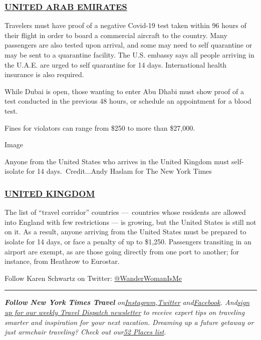 \hypertarget{united-arab-emirates}{%
\subsubsection{\texorpdfstring{\href{https://ae.usembassy.gov/u-s-citizen-services/covid-19-information/}{UNITED
ARAB EMIRATES}}{UNITED ARAB EMIRATES}}\label{united-arab-emirates}}

Travelers must have proof of a negative Covid-19 test taken within 96
hours of their flight in order to board a commercial aircraft to the
country. Many passengers are also tested upon arrival, and some may need
to self quarantine or may be sent to a quarantine facility. The U.S.
embassy says all people arriving in the U.A.E. are urged to self
quarantine for 14 days. International health insurance is also required.

While Dubai is open, those wanting to enter Abu Dhabi must show proof of
a test conducted in the previous 48 hours, or schedule an appointment
for a blood test.

Fines for violators can range from \$250 to more than \$27,000.

Image

Anyone from the United States who arrives in the United Kingdom must
self-isolate for 14 days.~Credit...Andy Haslam for The New York Times

\hypertarget{united-kingdom}{%
\subsubsection{\texorpdfstring{\href{https://www.gov.uk/uk-border-control}{UNITED
KINGDOM}}{UNITED KINGDOM}}\label{united-kingdom}}

The list of ``travel corridor'' countries ---~countries whose residents
are allowed into England with few restrictions --- is growing, but the
United States is still not on it. As a result, anyone arriving from the
United States must be prepared to isolate for 14 days, or face a penalty
of up to \$1,250. Passengers transiting in an airport are exempt, as are
those going directly from one port to another; for instance, from
Heathrow to Eurostar.

Follow Karen Schwartz on Twitter:
\href{https://twitter.com/wanderwomanisme?lang=en}{@WanderWomanIsMe}

\begin{center}\rule{0.5\linewidth}{\linethickness}\end{center}

\emph{\textbf{Follow New York Times Travel}}
\emph{on}\href{https://www.instagram.com/nytimestravel/}{\emph{Instagram}}\emph{,}\href{https://twitter.com/nytimestravel}{\emph{Twitter}}
\emph{and}\href{https://www.facebook.com/nytimestravel/}{\emph{Facebook}}\emph{.
And}\href{https://www.nytimes.com/newsletters/traveldispatch}{\emph{sign
up for our weekly Travel Dispatch newsletter}} \emph{to receive expert
tips on traveling smarter and inspiration for your next vacation.
Dreaming up a future getaway or just armchair traveling? Check out
our}\href{https://www.nytimes.com/interactive/2020/travel/places-to-visit.html}{\emph{52
Places list}}\emph{.}

